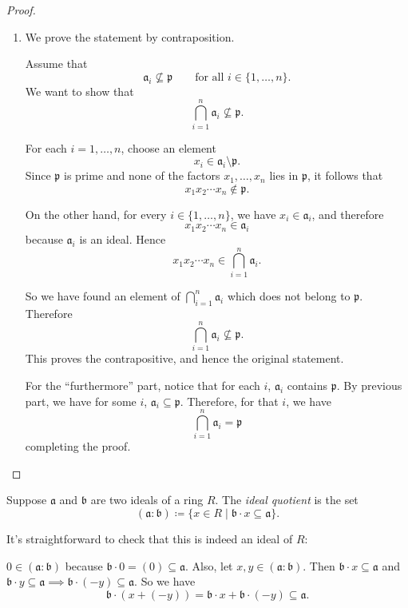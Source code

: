 \begin{proof}
\begin{enumerate}[label=\roman*), leftmargin=*]
Hence \(x\notin \mathfrak{p}_i\) for all \(i\), so
\[
x\notin \bigcup_{i=1}^k \mathfrak{p}_i.
\]
Since \(x\in \mathfrak{a}\), it follows that
\[
\mathfrak{a} \nsubseteq \bigcup_{i=1}^k \mathfrak{p}_i.
\]
This proves the contrapositive, and therefore proves (i).
    \item We prove the statement by contraposition.

Assume that
\[
\mathfrak{a}_i \nsubseteq \mathfrak p
\qquad \text{for all } i\in \{1,\dots,n\}.
\]
We want to show that
\[
\bigcap_{i=1}^n \mathfrak{a}_i \nsubseteq \mathfrak p.
\]

For each \(i=1,\dots,n\), choose an element
\[
x_i\in \mathfrak{a}_i \setminus \mathfrak p.
\]
Since \(\mathfrak p\) is prime and none of the factors \(x_1,\dots,x_n\) lies in \(\mathfrak p\), it follows that
\[
x_1x_2\cdots x_n \notin \mathfrak p.
\]

On the other hand, for every \(i\in \{1,\dots,n\}\), we have \(x_i\in \mathfrak{a}_i\), and therefore
\[
x_1x_2\cdots x_n \in \mathfrak{a}_i
\]
because \(\mathfrak{a}_i\) is an ideal. Hence
\[
x_1x_2\cdots x_n \in \bigcap_{i=1}^n \mathfrak{a}_i.
\]

So we have found an element of \(\bigcap_{i=1}^n \mathfrak{a}_i\) which does not belong to \(\mathfrak p\). Therefore
\[
\bigcap_{i=1}^n \mathfrak{a}_i \nsubseteq \mathfrak p.
\]
This proves the contrapositive, and hence the original statement.

For the ``furthermore'' part, notice that for each \( i \), \( \mathfrak{a}_i\) contains \( \mathfrak{p} \). By previous part, we have for some \( i \),  \( \mathfrak{a}_i \subseteq \mathfrak{p} \). Therefore, for that \( i \), we have 
 \[
\bigcap_{i = 1}^n \mathfrak{a}_i = \mathfrak{p}
\]
completing the proof.
\end{enumerate}
\end{proof}
\begin{definition}
    Suppose \(\mathfrak{a}\) and \(\mathfrak{b}\) are two ideals of a ring \(R\). The \emph{ideal quotient} is the set 
    \[
        (\mathfrak{a}: \mathfrak{b}) \coloneq \{x \in R  \mid \mathfrak{b} \cdot x \subseteq \mathfrak{a}\}.  
    \] 
\end{definition}
It's straightforward to check that this is indeed an ideal of \(R\):

 \(0 \in (\mathfrak{a}: \mathfrak{b})\) because \(\mathfrak{b} \cdot 0 = (0) \subseteq \mathfrak{a}\). Also, let \(x, y \in (\mathfrak{a}: \mathfrak{b})\). Then \(\mathfrak{b} \cdot x \subseteq \mathfrak{a}\) and \(\mathfrak{b} \cdot y \subseteq \mathfrak{a} \implies \mathfrak{b} \cdot (-y) \subseteq \mathfrak{a}\). So we have 
 \[
 \mathfrak{b} \cdot (x + (- y)) = \mathfrak{b} \cdot x + \mathfrak{b} \cdot (-y) \subseteq \mathfrak{a}.
 \] 

